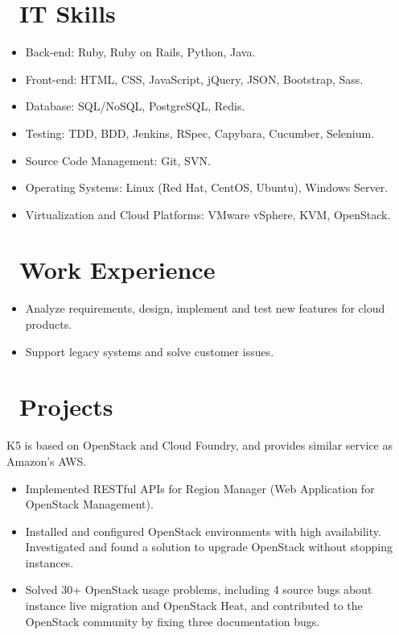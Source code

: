 \documentclass{resume}
\begin{document}



\section{\faCogs\ IT Skills}
\begin{itemize}[parsep=0.5ex]
  \item Back-end: Ruby, Ruby on Rails, Python, Java.
  \item Front-end: HTML, CSS, JavaScript, jQuery, JSON, Bootstrap, Sass.
  \item Database: SQL/NoSQL, PostgreSQL, Redis.
  \item Testing: TDD, BDD, Jenkins, RSpec, Capybara, Cucumber, Selenium.
  \item Source Code Management: Git, SVN.
  \item Operating Systems: Linux (Red Hat, CentOS, Ubuntu), Windows Server.
  \item Virtualization and Cloud Platforms: VMware vSphere, KVM, OpenStack.
\end{itemize}

\section{\faUsers\ Work Experience}
\begin{itemize}
  \item Analyze requirements, design, implement and test new features for cloud products.
  \item Support legacy systems and solve customer issues.
\end{itemize}

\section{\faTasks\ Projects}
K5 is based on OpenStack and Cloud Foundry, and provides similar service as Amazon's AWS.
\begin{itemize}
  \item Implemented RESTful APIs for Region Manager (Web Application for OpenStack Management).
  \item Installed and configured OpenStack environments with high availability. Investigated and found a solution to upgrade OpenStack without stopping instances.
  \item Solved 30+ OpenStack usage problems, including 4 source bugs about instance live migration and OpenStack Heat, and contributed to the OpenStack community by fixing three documentation bugs.
\end{itemize}
\end{document}
